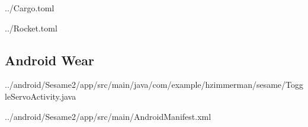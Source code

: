 \documentclass[a4paper]{article}
\begin{document}

{../Cargo.toml}


{../Rocket.toml}

\subsection{Android Wear}\label{subsec:androidWear}

{../android/Sesame2/app/src/main/java/com/example/hzimmerman/sesame/ToggleServoActivity.java}


{../android/Sesame2/app/src/main/AndroidManifest.xml}



%    



%    






\end{document}
